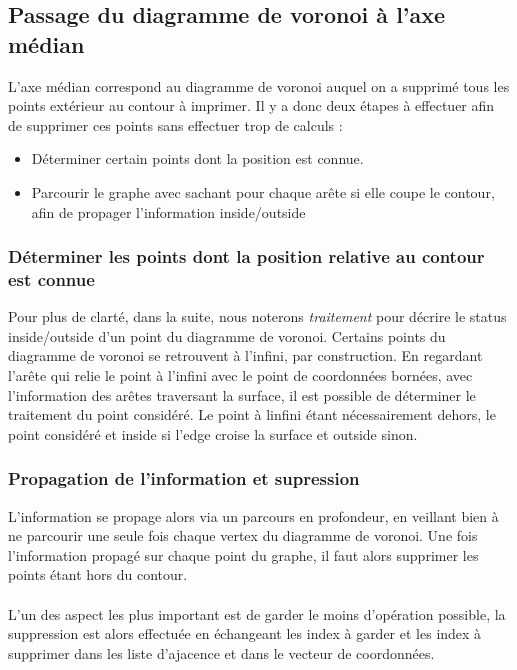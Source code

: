 \documentclass[11pt]{article}
\begin{document}
\subsection{Passage du diagramme de voronoi à l'axe médian}

L'axe médian correspond au diagramme de voronoi auquel on a supprimé tous les points extérieur au contour à imprimer. Il y a donc deux étapes à effectuer afin de supprimer ces points sans effectuer trop de calculs : 
\begin{itemize}
\item Déterminer certain points dont la position est connue.
\item Parcourir le graphe avec sachant pour chaque arête si elle coupe le contour, afin de propager l'information inside/outside
\end{itemize}


\subsubsection{Déterminer les points dont la position relative au contour est connue}
Pour plus de clarté, dans la suite, nous noterons \emph{traitement} pour décrire le status inside/outside d'un point du diagramme de voronoi. Certains points du diagramme de voronoi se retrouvent à l'infini, par construction. En regardant l'arête qui relie le point à l'infini avec le point de coordonnées bornées, avec l'information des arêtes traversant la surface, il est possible de déterminer le traitement du point considéré. Le point à linfini étant nécessairement dehors, le point considéré et inside si l'edge croise la surface et outside sinon.

\subsubsection{Propagation de l'information et supression}

L'information se propage alors via un parcours en profondeur, en veillant bien à ne parcourir une seule fois chaque vertex du diagramme de voronoi. Une fois l'information propagé sur chaque point du graphe, il faut alors supprimer les points étant hors du contour. 

\paragraph*{}
L'un des aspect les plus important est de garder le moins d'opération possible, la suppression est alors effectuée en échangeant les index à garder et les index à supprimer dans les liste d'ajacence et dans le vecteur de coordonnées.
\end{document}
